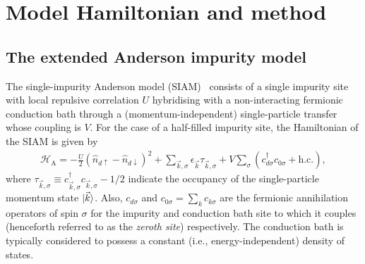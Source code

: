 \section{Model Hamiltonian and method}

\subsection{The extended Anderson impurity model}
\label{def-ham}

The single-impurity Anderson model (SIAM)~\cite{anderson_1961,anderson_1978} consists of a single impurity site with local repulsive correlation \(U\) hybridising with a non-interacting fermionic conduction bath through a (momentum-independent) single-particle transfer whose coupling is \(V\). For the case of a half-filled impurity site, the Hamiltonian of the SIAM is given by
\begin{eqnarray} 
	\mathcal{H}_\text{A} = -\frac{U}{2} \left(\hat n_{d \uparrow} - \hat n_{d \downarrow}\right)^2 + \sum_{\vec k,\sigma} \epsilon_{\vec k} \tau_{\vec k,\sigma} + V\sum_\sigma \left(c^\dagger_{d\sigma}c_{0\sigma} + \text{h.c.}\right),
	\label{basic-siam}
\end{eqnarray}
where \(\tau_{\vec k,\sigma} \equiv c^\dagger_{\vec k,\sigma}c_{\vec k,\sigma} - 1/2\) indicate the occupancy of the single-particle momentum state \(\ket{\vec k}\). Also, \(c_{d\sigma}\) and \(c_{0\sigma} = \sum_k c_{k\sigma}\) are the fermionic annihilation operators of spin \(\sigma\) for the impurity and conduction bath site to which it couples (henceforth referred to as the {\it zeroth site}) respectively.  The conduction bath is typically considered to possess a constant (i.e., energy-independent) density of states. 

